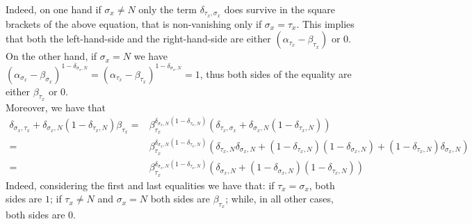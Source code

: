 \documentclass[10pt]{article}
\numberwithin{equation}{section}
\numberwithin{equation}{subsection}
\begin{document}
Indeed, on one hand if $\sigma_{x}\neq N$ only the term $\delta_{\tau_{x},\sigma_{x}}$ does survive in the square brackets of the above equation, that is non-vanishing only if $\sigma_{x}=\tau_{x}$. This implies that both the left-hand-side and the right-hand-side are either $(\alpha_{\tau_{x}}-\beta_{\tau_{x}})$ or $0$. On the other hand, if $\sigma_{x}=N$ we have $(\alpha_{\sigma_{x}}-\beta_{\sigma_{x}})^{1-\delta_{\sigma_{x},N}}=(\alpha_{\tau_{x}}-\beta_{\tau_{x}})^{1-\delta_{\sigma_{x},N}}=1$, thus both sides of the equality are either $\beta_{\tau_{x}}$ or $0$.  \\
Moreover, we have that 
\begin{align}
	\delta_{\sigma_{x},\tau_{x}}+\delta_{\sigma_{x},N}(1-\delta_{\tau_{x},N})\beta_{\tau_{x}}=&\beta_{\tau_{x}}^{\delta_{\sigma_{x},N}(1-\delta_{\tau_{x},N})}\left(\delta_{\tau_{x},\sigma_{x}}+\delta_{\sigma_{x},N}(1-\delta_{\tau_{x},N})\right)\nonumber\\
	=&\beta_{\tau_{x}}^{\delta_{\sigma_{x},N}(1-\delta_{\tau_{x},N})}\left(\delta_{\tau_{x},N}\delta_{\sigma_{x},N}+(1-\delta_{\tau_{x},N})(1-\delta_{\sigma_{x},N})+(1-\delta_{\tau_{x},N})\delta_{\sigma_{x},N}\right)\nonumber\\
	=&\beta_{\tau_{x}}^{\delta_{\sigma_{x},N}(1-\delta_{\tau_{x},N})}\left(\delta_{\sigma_{x},N}+(1-\delta_{\sigma_{x},N})(1-\delta_{\tau_{x},N})\right)
\end{align}
Indeed, considering the first and last equalities we have that: if $\tau_{x}=\sigma_{x}$, both sides are $1$; if $\tau_{x}\neq N$ and $\sigma_{x}=N$ both sides are $\beta_{\tau_{x}}$; while, in all other cases, both sides are $0$. 
\end{document}
